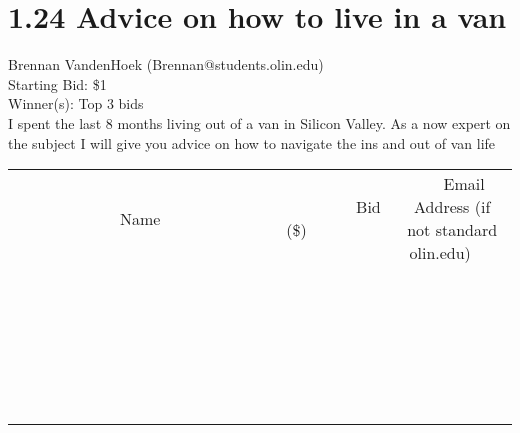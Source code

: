 \documentclass[11pt]{article}
\begin{document}
\section*{1.24 Advice on how to live in a van}
Brennan VandenHoek (Brennan@students.olin.edu) \\
Starting Bid: \$1 \\
Winner(s): 
Top 3 bids \\
I spent the last 8 months living out of a van in Silicon Valley. As a now expert on the subject I will give you advice on how to navigate the ins and out of van life \\[6ex]
\begin{tabular}{c c c}
~~~~~~~~~~~~~Name~~~~~~~~~~~~~ & ~~~~~~~~~Bid (\$)~~~~~~~~~ & ~~~Email Address (if not standard olin.edu)~~~ \\
 & & \\
\hline
 & & \\
\hline
 & & \\
\hline
 & & \\
\hline
 & & \\
\hline
 & & \\
\hline
 & & \\
\hline
 & & \\
\hline
 & & \\
\hline
 & & \\
\hline
 & & \\
\hline
 & & \\
\hline
 & & \\
\hline
 & & \\
\hline
 & & \\
\hline
 & & \\
\hline
 & & \\
\hline
 & & \\
\hline
 & & \\
\hline
 & & \\
\hline
 & & \\
\hline
 & & \\
\hline
 & & \\
\hline
 & & \\
\hline
 & & \\
\hline
 & & \\
\hline
\end{tabular}
\clearpage
\end{document}
